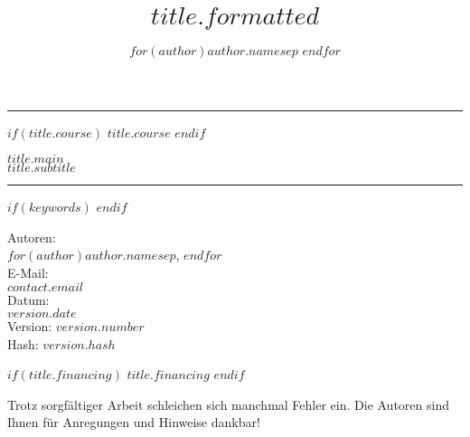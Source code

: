 \documentclass[12pt,a4paper, twoside=false]{scrartcl}
\author{
$for(author)$$author.name$$sep$ \And $endfor$
}
\title{$title.formatted$}
\providecommand{\Keywords}[1]{%
\section*{Begriffe}%
\hrule%
\vspace{-3mm}%
\begin{multicols}{3}%
\begin{itemize}[leftmargin=0mm]
$for(keywords)$\item[] $keywords$ $endfor$
\end{itemize}%
\end{multicols}%
\vspace{-2mm}%
\hrule%
\needspace{.25\textheight}%
}
\begin{document}
\begin{titlepage}

\par
{}%
\hfill
{}%
\par

\begin{center}

\noindent\rule{\textwidth}{0.4pt}


$if(title.course)$
\vspace{0.5 cm} {\large \textsf{$title.course$}}
$endif$


\vspace{0.5 cm} {\LARGE \textbf{ \textsf{$title.main$}}}\\
\vspace{0.5 cm} {\Large \textsf{$title.subtitle$}}


\noindent\rule{\textwidth}{0.4pt}
\setcounter{tocdepth}{3}
\tableofcontents


$if(keywords)$
\Keywords
$endif$

\end{center}


 \begin{center}
  	\vspace{1 cm}Autoren: \\ \vspace{2 mm}$for(author)$$author.name$$sep$, $endfor$ \\
  	\vspace{0.5cm}E-Mail: \\ \vspace{2 mm} $contact.email$ \\
   	\vspace{0.5 cm}Datum: \\ \vspace{2 mm} $version.date$ \\
   	\vspace{0.5 cm}  Version: $version.number$\\
   	\vspace{2 mm}  Hash: $version.hash$

$if(title.financing)$
	\vspace{0.5 cm}  $title.financing$
$endif$

	\vspace{0.5 cm}
    Trotz sorgfältiger Arbeit schleichen sich manchmal Fehler ein. Die Autoren sind Ihnen für Anregungen und Hinweise dankbar!\\
    \vfill
   	\end{center}


\end{titlepage}
\end{document}
